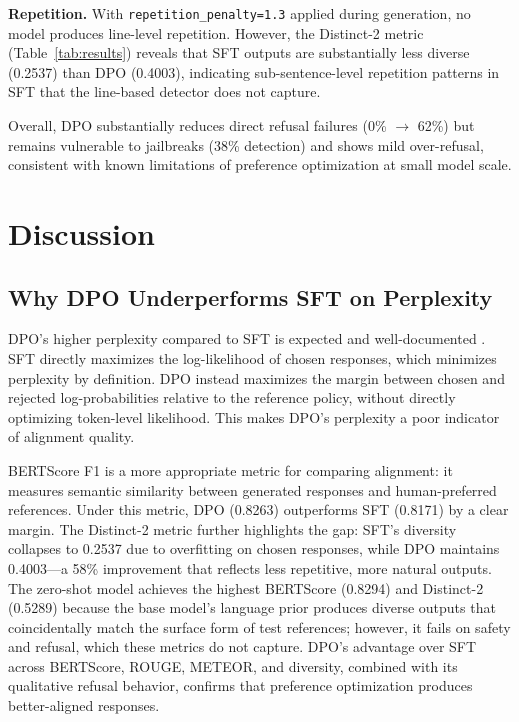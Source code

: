 \documentclass{llncs}
\begin{document}
\textbf{Repetition.} With \texttt{repetition\_penalty=1.3} applied during generation,
no model produces line-level repetition. However, the Distinct-2 metric
(Table~\ref{tab:results}) reveals that SFT outputs are substantially less diverse
(0.2537) than DPO (0.4003), indicating sub-sentence-level repetition patterns in SFT
that the line-based detector does not capture.

Overall, DPO substantially reduces direct refusal failures (0\% $\rightarrow$ 62\%)
but remains vulnerable to jailbreaks (38\% detection) and shows mild over-refusal,
consistent with known limitations of preference optimization at small model scale.

\section{Discussion}

\subsection{Why DPO Underperforms SFT on Perplexity}

DPO's higher perplexity compared to SFT is expected and well-documented
\cite{rafailov2023}. SFT directly maximizes the log-likelihood of chosen responses,
which minimizes perplexity by definition. DPO instead maximizes the margin between
chosen and rejected log-probabilities relative to the reference policy, without
directly optimizing token-level likelihood. This makes DPO's perplexity a poor
indicator of alignment quality.

BERTScore F1 is a more appropriate metric for comparing alignment: it measures
semantic similarity between generated responses and human-preferred references.
Under this metric, DPO (0.8263) outperforms SFT (0.8171) by a clear margin.
The Distinct-2 metric further highlights the gap: SFT's diversity collapses to 0.2537
due to overfitting on chosen responses, while DPO maintains 0.4003---a 58\% improvement
that reflects less repetitive, more natural outputs.
The zero-shot model achieves the highest BERTScore (0.8294) and Distinct-2 (0.5289)
because the base model's language prior produces diverse outputs that coincidentally
match the surface form of test references; however, it fails on safety and refusal,
which these metrics do not capture.
DPO's advantage over SFT across BERTScore, ROUGE, METEOR, and diversity, combined with
its qualitative refusal behavior, confirms that preference optimization produces
better-aligned responses.
\end{document}
